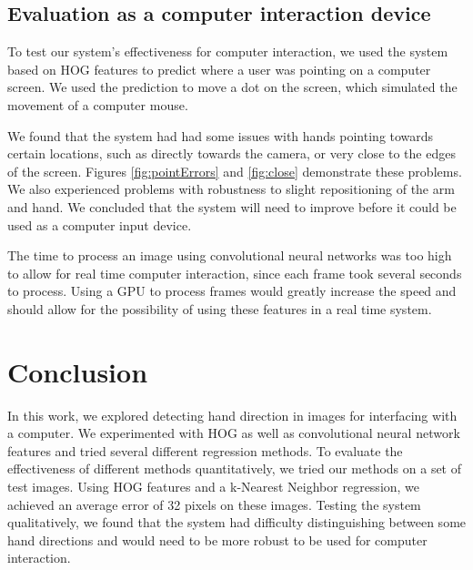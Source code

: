 \documentclass[10pt,twocolumn,letterpaper]{article}
\begin{document}
\subsection{Evaluation as a computer interaction device}
	
To test our system's effectiveness for computer interaction, we used the system based on HOG features to predict where a user was pointing on a computer screen.  We used the prediction to move a dot on the screen, which simulated the movement of a computer mouse.

We found that the system had had some issues with hands pointing towards certain locations, such as directly towards the camera, or very close to the edges of the screen.  Figures \ref{fig:pointErrors} and \ref{fig:close} demonstrate these problems.  We also experienced problems with robustness to slight repositioning of the arm and hand.  We concluded that the system will need to improve before it could be used as a computer input device.

The time to process an image using convolutional neural networks was too high to allow for real time computer interaction, since each frame took several seconds to process.  Using a GPU to process frames would greatly increase the speed and should allow for the possibility of using these features in a real time system.

\newpage
\section{Conclusion}

In this work, we explored detecting hand direction in images for interfacing with a computer.  We experimented with HOG as well as convolutional neural network features and tried several different regression methods.  To evaluate the effectiveness of different methods quantitatively, we tried our methods on a set of test images.  Using HOG features and a k-Nearest Neighbor regression, we achieved an average error of 32 pixels on these images.  Testing the system qualitatively, we found that the system had difficulty distinguishing between some hand directions and would need to be more robust to be used for computer interaction.

\newpage

{\small


}
\end{document}

